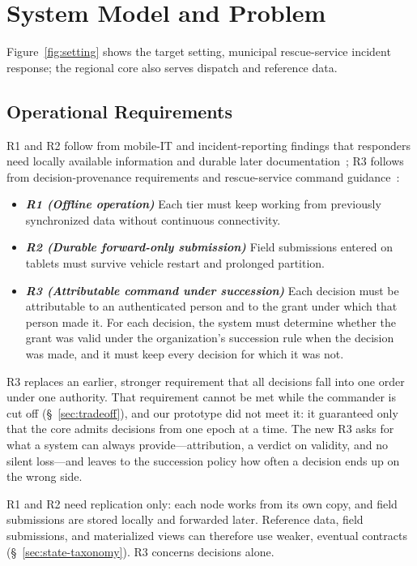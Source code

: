 \section{System Model and Problem}
\label{sec:problem-analysis}

Figure~\ref{fig:setting} shows the target setting, municipal rescue-service incident
response; the regional core also serves dispatch and reference data.

\subsection{Operational Requirements}
\label{sec:requirements}

R1 and R2 follow from mobile-IT and incident-reporting findings that responders need
locally available information and durable later
documentation~\cite{rsg-kommunalplan,pilemalm2014enabling,westman2021mobilisation}; R3
follows from decision-provenance requirements and rescue-service command
guidance~\cite{naja2010provenance,rsg-rad201}:
\begin{itemize}
  \item \textbf{\textit{R1 (Offline operation)}} Each tier must keep working from
  previously synchronized data without continuous connectivity.
  \item \textbf{\textit{R2 (Durable forward-only submission)}} Field submissions entered
  on tablets must survive vehicle restart and prolonged partition.
  \item \textbf{\textit{R3 (Attributable command under succession)}} Each decision must be
  attributable to an authenticated person and to the grant under which that person made
  it. For each decision, the system must determine whether the grant was valid under the
  organization's succession rule when the decision was made, and it must keep every
  decision for which it was not.
\end{itemize}

R3 replaces an earlier, stronger requirement that all decisions fall into one order under
one authority. That requirement cannot be met while the commander is cut off
(\S~\ref{sec:tradeoff}), and our prototype did not meet it: it guaranteed only that the
core admits decisions from one epoch at a time. The new R3 asks for what a system can
always provide---attribution, a verdict on validity, and no silent loss---and leaves to the
succession policy how often a decision ends up on the wrong side.

R1 and R2 need replication only: each node works from its own copy, and field
submissions are stored locally and forwarded later. Reference data, field submissions,
and materialized views can therefore use weaker, eventual contracts
(\S~\ref{sec:state-taxonomy}). R3 concerns decisions alone.

